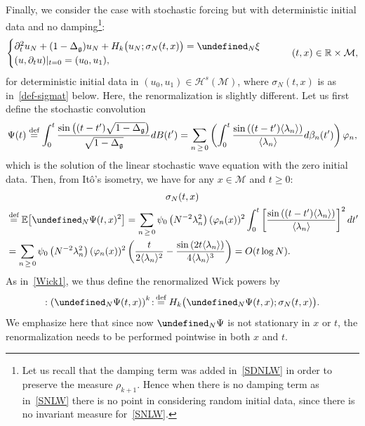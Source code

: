 \documentclass[AHL,Unicode,longabstracts,published]{cedram}
\newcommand{\R}{\mathbb{R}}
\newcommand{\E}{\mathbb{E}}
\newcommand{\deff}{\overset{\textup{def}}{=}}
\let\P= \undefined
\newcommand{\P}{\mathbf{P}}
\newcommand{\M}{\mathcal{M}}
\renewcommand{\H}{\mathcal{H}}
\newcommand{\g}{\mathfrak{g}}
\newcommand{\Dlg}{\Delta_{\g}}
\newcommand{\s}{\sigma}
\newcommand{\dt}{\partial_t}
\newcommand{\jb}[1] {\langle #1 \rangle}
\begin{document}
Finally, we consider the case with stochastic forcing but with deterministic initial data and no damping\footnote{Let us recall that the damping term was added in~\eqref{SDNLW} in order to preserve the measure $\rho_{k+1}$. Hence when there is no damping term as in~\eqref{SNLW} there is no point in considering random initial data, since there is no invariant measure for~\eqref{SNLW}.}:
\begin{equation}\label{trunc-SNLW}
\begin{cases}
\dt^2 u_N +(1- \Dlg) u_N + H_k \big(u_N;\s_N(t,x)\big) = \P_N\xi \\
(u, \dt u) |_{t = 0} = (u_0, u_1),
\end{cases}
\qquad (t,x) \in \R \times \M,
\end{equation}
for deterministic initial data in $(u_0,u_1)\in\H^s(\M)$, where $\s_N(t,x)$ is as in~\eqref{def-sigmat} below. Here, the renormalization is slightly different. Let us first define the stochastic convolution
\begin{equation*}
\Psi(t)
\deff\int_0^t\frac{\sin\left((t-t')\sqrt{1-\Dlg}\right)}{\sqrt{1-\Dlg}}dB(t') = \sum_{n\,\geq\,0}\left(\int_0^t\frac{\sin\left((t-t')\jb{\lambda_n}\right)}{\jb{\lambda_n}}d\beta_n(t')\right)\varphi_n,
\end{equation*}
which is the solution of the linear stochastic wave equation with the zero initial data. Then, from Itô's isometry, we have for any $x\in\M$ and $t\geq 0$:
\begin{multline}\label{def-sigmat}
\s_N(t,x)\\
\begin{aligned}
&\deff \E\big[\P_N\Psi(t,x)^2\big]=\sum_{n\,\geq\,0}\psi_0\left(N^{-2}\lambda_n^2\right)(\varphi_n(x))^2\int_0^t \left[\frac{\sin\left((t-t')\jb{\lambda_n}\right)}{\jb{\lambda_n}}\right]^2dt'\\
&=\sum_{n\,\geq\,0}\psi_0\left(N^{-2}\lambda_n^2\right)(\varphi_n(x))^2\left(\frac{t}{2\jb{\lambda_n}^2}-\frac{\sin\left(2t\jb{\lambda_n}\right)}{4\jb{\lambda_n}^3}\right) =O(t\log N).
\end{aligned}
\end{multline}
As in~\eqref{Wick1}, we thus define the renormalized Wick powers by
\begin{equation}\label{def-WickPsi}
:\left(\P_N\Psi(t,x)\right)^k\!:\, \deff H_k\big(\P_N\Psi(t,x);\s_N(t,x)\big).
\end{equation}
We emphasize here that since now $\P_N\Psi$ is not stationary in $x$ or $t$, the renormalization needs to be performed pointwise in both $x$ and $t$.
\end{document}

